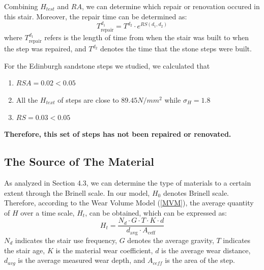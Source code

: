 \documentclass[12pt]{article}  %
\numberwithin{equation}{section} %
\begin{document}
 Combining $H_{test}$ and $RA$, we can determine which repair or renovation occured in this stair. Moreover, the repair time can be determined as:
 \begin{equation}
     T_{\text{repair}}^{d_1} = T^{d_2} \cdot e^{RS(d_1, d_2)}
 \end{equation}
 where $T_{\text{repair}}^{d_1}$ refers is the length of time from when the stair was built to when the step was repaired, and $T^{d_2}$ denotes the time that the stone steps were built.
 
For the Edinburgh sandstone steps we studied, we calculated that
\begin{enumerate}[\bfseries (1)]
\vspace{-0.5em}
	\setlength{\parsep}{0ex} %
	\setlength{\topsep}{-1ex} %
	\setlength{\itemsep}{0ex} %
	\item $RSA=0.02<0.05$
	\item All the $H_{text}$ of steps are close to $89.45N/mm^2$ while $\sigma_H=1.8$
	\item $RS=0.03<0.05$
 \vspace{-0.5em}
\end{enumerate}

\textbf{Therefore, this set of steps has not been repaired or renovated.}

 
 
\subsection{The Source of The Material}
As analyzed in Section 4.3, we can determine the type of materials to a certain extent through the Brinell scale. In our model, $H_0$ denotes Brinell scale. Therefore, according to the Wear Volume Model (\ref{MVM}), the average quantity of $H$ over a time scale, $H_t$, can be obtained, which can be expressed as:
\begin{equation}
    H_t = \frac{N_d \cdot G \cdot T \cdot K \cdot d}{d_{\text{avg}} \cdot A_{\text{ceff}}}
    \label{eq:Htest}
\end{equation}
$N_d$ indicates the stair use frequency, $G$ denotes the average gravity, $T$ indicates the stair age, $K$ is the material wear coefficient, $d$ is the average wear distance, $d_{avg}$ is the average measured wear depth, and $A_{ceff}$ is the area of the step.
\end{document}

